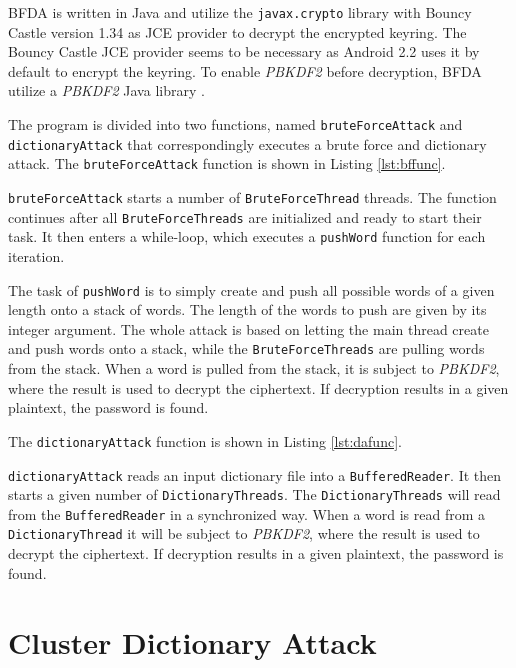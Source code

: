 \documentclass[pdftex,english,10pt,b5paper,twoside]{book}
\begin{document}
\ac{BFDA} is written in Java and utilize the \texttt{javax.crypto} library with Bouncy
Castle version 1.34 as JCE provider to decrypt the encrypted keyring. The
Bouncy Castle JCE provider seems to be necessary as Android 2.2 uses it by
default to encrypt the keyring. To enable \emph{PBKDF2} before decryption, \ac{BFDA}
utilize a \emph{PBKDF2} Java library \cite{pbkdf2}.

The program is divided into two functions, named \texttt{bruteForceAttack} and
\texttt{dictionaryAttack} that correspondingly executes a brute force and
dictionary attack. The \texttt{bruteForceAttack} function is shown in Listing
\ref{lst:bffunc}.



\texttt{bruteForceAttack} starts a number of \texttt{BruteForceThread} threads.
The function continues after all \texttt{BruteForceThreads} are initialized and
ready to start their task. It then enters a while-loop, which executes a
\texttt{pushWord} function for each iteration.

The task of \texttt{pushWord} is to simply create and push all possible words
of a given length onto a stack of words. The length of the words to push are
given by its integer argument. The whole attack is based on letting the main
thread create and push words onto a stack, while the \texttt{BruteForceThreads} are
pulling words from the stack. When a word is pulled from the stack, it is
subject to \emph{PBKDF2}, where the result is used to decrypt the ciphertext. If
decryption results in a given plaintext, the password is found.

The \texttt{dictionaryAttack} function is shown in Listing \ref{lst:dafunc}.



\texttt{dictionaryAttack} reads an input dictionary file into a
\texttt{BufferedReader}. It then starts a given number of
\texttt{DictionaryThreads}. The \texttt{DictionaryThreads} will read from the
\texttt{BufferedReader} in a synchronized way. When a word is read from a
\texttt{DictionaryThread} it will be subject to \emph{PBKDF2}, where the result is
used to decrypt the ciphertext. If decryption results in a given plaintext, the
password is found.

\section{Cluster Dictionary Attack}
\end{document}
